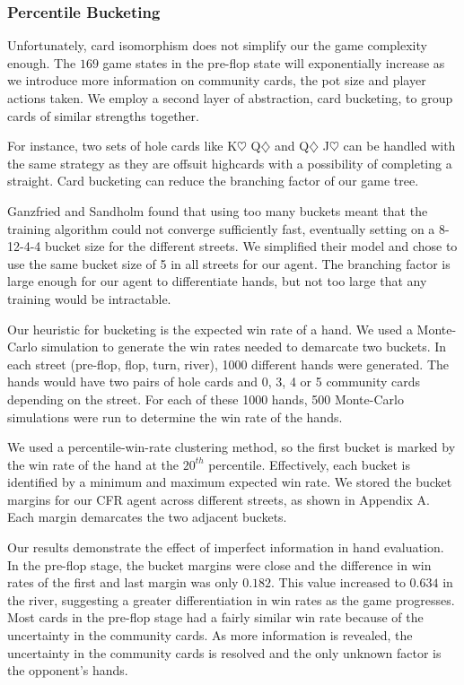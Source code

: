 \documentclass{article}
\begin{document}
\subsubsection{Percentile Bucketing}
Unfortunately, card isomorphism does not simplify our the game complexity enough. The $169$ game states in the pre-flop state will exponentially increase as we introduce more information on community cards, the pot size and player actions taken. We employ a second layer of abstraction, card bucketing, to group cards of similar strengths together. 

For instance, two sets of hole cards like K$\heartsuit$ Q$\diamondsuit$ and Q$\diamondsuit$ J$\heartsuit$ can be handled with the same strategy as they are offsuit highcards with a possibility of completing a straight. Card bucketing can reduce the branching factor of our game tree.

Ganzfried and Sandholm found that using too many buckets meant that the training algorithm could not converge sufficiently fast, eventually setting on a 8-12-4-4 bucket size for the different streets. We simplified their model and chose to use the same bucket size of 5 in all streets for our agent. The branching factor is large enough for our agent to differentiate hands, but not too large that any training would be intractable.

Our heuristic for bucketing is the expected win rate of a hand. We used a Monte-Carlo simulation to generate the win rates needed to demarcate two buckets. In each street (pre-flop, flop, turn, river), 1000 different hands were generated. The hands would have  two pairs of hole cards and 0, 3, 4 or 5 community cards depending on the street. For each of these 1000 hands, 500 Monte-Carlo simulations were run to determine the win rate of the hands.

We used a percentile-win-rate clustering method, so the first bucket is marked by the win rate of the hand at the $20^{th}$ percentile. Effectively, each bucket is identified by a minimum and maximum expected win rate. We stored the bucket margins for our CFR agent across different streets, as shown in Appendix A. Each margin demarcates the two adjacent buckets.

Our results demonstrate the effect of imperfect information in hand evaluation. In the pre-flop stage, the bucket margins were close and the difference in win rates of the first and last margin was only $0.182$. This value increased to $0.634$ in the river, suggesting a greater differentiation in win rates as the game progresses. Most cards in the pre-flop stage had a fairly similar win rate because of the uncertainty in the community cards. As more information is revealed, the uncertainty in the community cards is resolved and the only unknown factor is the opponent's hands.
\end{document}
